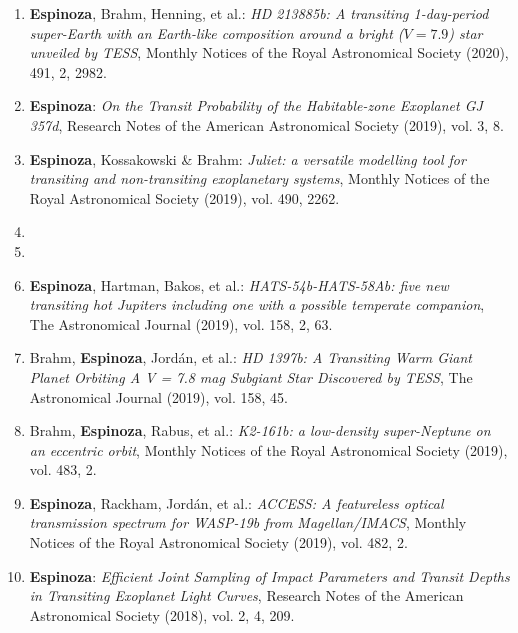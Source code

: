 \documentclass[12pt, a4paper]{article} %
\begin{document}
\begin{flushleft}
\begin{enumerate}
\item \textbf{Espinoza}, Brahm, Henning, et al.: \textit{HD 213885b: A transiting 1-day-period super-Earth with an Earth-like composition around a bright ($V=7.9$) star unveiled by TESS}, Monthly Notices of the Royal Astronomical Society (2020), 491, 2, 2982.
\item \textbf{Espinoza}: \textit{On the Transit Probability of the Habitable-zone Exoplanet GJ 357d}, Research Notes of the American Astronomical Society (2019), vol. 3, 8.
\item \textbf{Espinoza}, Kossakowski \& Brahm: \textit{Juliet: a versatile modelling tool for transiting and non-transiting exoplanetary systems}, Monthly Notices of the Royal Astronomical Society (2019), vol. 490, 2262. 
\item  {}
\item  {}
\item \textbf{Espinoza}, Hartman, Bakos, et al.: \textit{HATS-54b-HATS-58Ab: five new transiting hot Jupiters including one with a possible temperate companion}, The Astronomical Journal (2019), vol. 158, 2, 63.
\item Brahm, \textbf{Espinoza}, Jord\'an, et al.: \textit{HD 1397b: A Transiting Warm Giant Planet Orbiting A V = 7.8 mag Subgiant Star Discovered by TESS}, The Astronomical Journal (2019), vol. 158, 45.
\item Brahm, \textbf{Espinoza}, Rabus, et al.: \textit{K2-161b: a low-density super-Neptune on an eccentric orbit}, Monthly Notices of the Royal Astronomical Society (2019), vol. 483, 2.
\item \textbf{Espinoza}, Rackham, Jord\'an, et al.: \textit{ACCESS: A featureless optical transmission spectrum for WASP-19b from Magellan/IMACS}, Monthly Notices of the Royal Astronomical Society (2019), vol. 482, 2.
\item \textbf{Espinoza}: \textit{Efficient Joint Sampling of Impact Parameters and Transit Depths in Transiting Exoplanet Light Curves}, Research Notes of the American Astronomical Society (2018), vol. 2, 4, 209.

\end{enumerate}
\end{flushleft}
\end{document}
